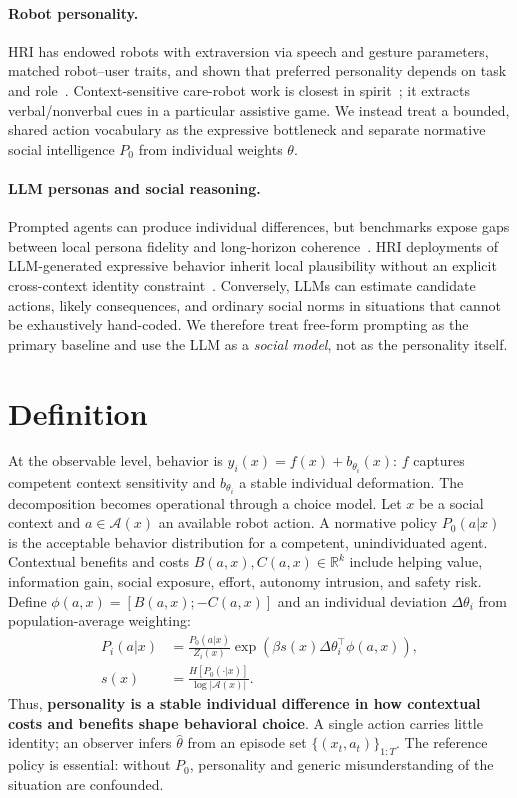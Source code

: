 \documentclass[letterpaper,10pt,conference]{ieeeconf}
\begin{document}
\paragraph{Robot personality.}
HRI has endowed robots with extraversion via speech and gesture parameters, matched robot--user traits, and shown that preferred personality depends on task and role~\cite{esterwood2021review}. Context-sensitive care-robot work is closest in spirit~\cite{andriella2021}; it extracts verbal/nonverbal cues in a particular assistive game. We instead treat a bounded, shared action vocabulary as the expressive bottleneck and separate normative social intelligence $P_0$ from individual weights $\theta$.

\paragraph{LLM personas and social reasoning.}
Prompted agents can produce individual differences, but benchmarks expose gaps between local persona fidelity and long-horizon coherence~\cite{samuel2025personagym,qi2026coherence}. HRI deployments of LLM-generated expressive behavior inherit local plausibility without an explicit cross-context identity constraint~\cite{mahadevan2024}. Conversely, LLMs can estimate candidate actions, likely consequences, and ordinary social norms in situations that cannot be exhaustively hand-coded. We therefore treat free-form prompting as the primary baseline and use the LLM as a \emph{social model}, not as the personality itself.

\section{Definition}
At the observable level, behavior is $y_i(x)=f(x)+b_{\theta_i}(x)$: $f$ captures competent context sensitivity and $b_{\theta_i}$ a stable individual deformation. The decomposition becomes operational through a choice model. Let $x$ be a social context and $a \in {\mathcal A}(x)$ an available robot action. A normative policy $P_0(a|x)$ is the acceptable behavior distribution for a competent, unindividuated agent. Contextual benefits and costs $B(a,x),C(a,x)\in\mathbb{R}^k$ include helping value, information gain, social exposure, effort, autonomy intrusion, and safety risk. Define $\phi(a,x)=[B(a,x);-C(a,x)]$ and an individual deviation $\Delta\theta_i$ from population-average weighting:
\begin{align}
P_i(a|x)
&=\frac{P_0(a|x)}{Z_i(x)}
\exp\!\left(\beta s(x)\Delta\theta_i^\top\phi(a,x)\right), \nonumber\\
s(x)&=\frac{H[P_0(\cdot|x)]}{\log|{\mathcal A}(x)|}.
\label{eq:policy}
\end{align}
Thus, \textbf{personality is a stable individual difference in how contextual costs and benefits shape behavioral choice}. A single action carries little identity; an observer infers $\hat\theta$ from an episode set $\{(x_t,a_t)\}_{1:T}$. The reference policy is essential: without $P_0$, personality and generic misunderstanding of the situation are confounded.
\end{document}
